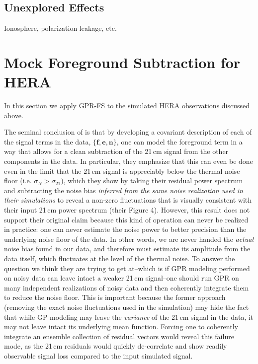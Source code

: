 \documentclass[a4paper,fleqn,usenatbib]{mnras}
\def\e{\boldsymbol{e}}
\def\f{\boldsymbol{f}}
\def\n{\boldsymbol{n}}
\begin{document}
\subsection{Unexplored Effects} 
Ionosphere, polarization leakage, etc.


\section{Mock Foreground Subtraction for HERA}
\label{sec:hera_gprfs}
In this section we apply GPR-FS to the simulated HERA observations discussed above.


The seminal conclusion of  is that by developing a covariant description of each of the signal terms in the data, $\{\f, \e, \n\}$, one can model the foreground term in a way that allows for a clean subtraction of the 21\,cm signal from the other components in the data.
In particular, they emphasize that this can even be done even in the limit that the 21\,cm signal is appreciably below the thermal noise floor (i.e. $\sigma_{N} > \sigma_{21}$), which they show by taking their residual power spectrum and subtracting the noise bias \emph{inferred from the same noise realization used in their simulations} to reveal a non-zero fluctuations that is visually consistent with their input 21\,cm power spectrum (their Figure 4).
However, this result does not support their original claim because this kind of operation can never be realized in practice: one can never estimate the noise power to better precision than the underlying noise floor of the data.
In other words, we are never handed the \emph{actual} noise bias found in our data, and therefore must estimate its amplitude from the data itself, which fluctuates at the level of the thermal noise.
To answer the question we think they are trying to get at--which is if GPR modeling performed on noisy data can leave intact a weaker 21\,cm signal--one should run GPR on many independent realizations of noisy data and then coherently integrate them to reduce the noise floor.
This is important because the former approach (removing the exact noise fluctuations used in the simulation) may hide the fact that while GP modeling may leave the \emph{variance} of the 21\,cm signal in the data, it may not leave intact its underlying mean function.
Forcing one to coherently integrate an ensemble collection of residual vectors would reveal this failure mode, as the 21\,cm residuals would quickly de-correlate and show readily observable signal loss compared to the input simulated signal.
\end{document}
